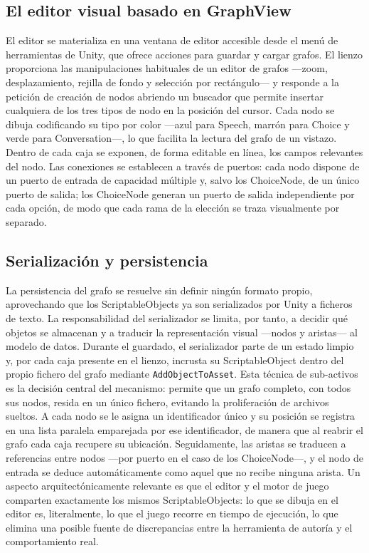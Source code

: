 \documentclass[12pt,twoside,titlepage]{report}
\begin{document}
\subsection{El editor visual basado en GraphView}

El editor se materializa en una ventana de editor accesible desde el menú de herramientas de Unity, que ofrece acciones para guardar y cargar grafos. El lienzo proporciona las manipulaciones habituales de un editor de grafos ---zoom, desplazamiento, rejilla de fondo y selección por rectángulo--- y responde a la petición de creación de nodos abriendo un buscador que permite insertar cualquiera de los tres tipos de nodo en la posición del cursor. Cada nodo se dibuja codificando su tipo por color ---azul para Speech, marrón para Choice y verde para Conversation---, lo que facilita la lectura del grafo de un vistazo. Dentro de cada caja se exponen, de forma editable en línea, los campos relevantes del nodo. Las conexiones se establecen a través de puertos: cada nodo dispone de un puerto de entrada de capacidad múltiple y, salvo los ChoiceNode, de un único puerto de salida; los ChoiceNode generan un puerto de salida independiente por cada opción, de modo que cada rama de la elección se traza visualmente por separado.

\subsection{Serialización y persistencia}

La persistencia del grafo se resuelve sin definir ningún formato propio, aprovechando que los ScriptableObjects ya son serializados por Unity a ficheros de texto. La responsabilidad del serializador se limita, por tanto, a decidir qué objetos se almacenan y a traducir la representación visual ---nodos y aristas--- al modelo de datos. Durante el guardado, el serializador parte de un estado limpio y, por cada caja presente en el lienzo, incrusta su ScriptableObject dentro del propio fichero del grafo mediante \texttt{AddObjectToAsset}. Esta técnica de sub-activos es la decisión central del mecanismo: permite que un grafo completo, con todos sus nodos, resida en un único fichero, evitando la proliferación de archivos sueltos. A cada nodo se le asigna un identificador único y su posición se registra en una lista paralela emparejada por ese identificador, de manera que al reabrir el grafo cada caja recupere su ubicación. Seguidamente, las aristas se traducen a referencias entre nodos ---por puerto en el caso de los ChoiceNode---, y el nodo de entrada se deduce automáticamente como aquel que no recibe ninguna arista. Un aspecto arquitectónicamente relevante es que el editor y el motor de juego comparten exactamente los mismos ScriptableObjects: lo que se dibuja en el editor es, literalmente, lo que el juego recorre en tiempo de ejecución, lo que elimina una posible fuente de discrepancias entre la herramienta de autoría y el comportamiento real.
\end{document}
